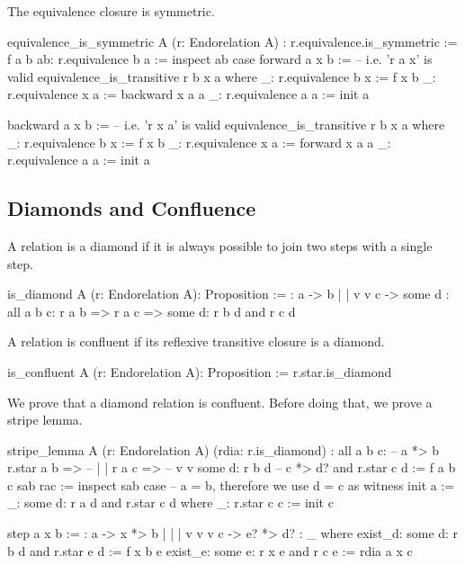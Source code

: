 The equivalence closure is symmetric.

\begin{alba}
  equivalence_is_symmetric
    A (r: Endorelation A)
    : r.equivalence.is_symmetric :=
    f a b ab: r.equivalence b a :=
      inspect ab case
        forward a x b :=   -- i.e. 'r a x' is valid
          equivalence_is_transitive r b x a where
            _: r.equivalence b x := f x b
            _: r.equivalence x a := backward x a a
            _: r.equivalence a a := init a

        backward a x b :=  -- i.e. 'r x a' is valid
          equivalence_is_transitive r b x a where
            _: r.equivalence b x := f x b
            _: r.equivalence x a := forward x a a
            _: r.equivalence a a := init a
\end{alba}






\subsection{Diamonds and Confluence}


A relation is a diamond if it is always possible to join two steps with a
single step.

\begin{alba}
  is_diamond A (r: Endorelation A): Proposition :=
      {:   a  ->  b
           |      |
           v      v
           c  -> some d :}
    all a b c:
      r a b
      => r a c
      => some d: r b d and r c d
\end{alba}


A relation is confluent if its reflexive transitive closure is a diamond.

\begin{alba}
  is_confluent A (r: Endorelation A): Proposition :=
    r.star.is_diamond
\end{alba}



We prove that a diamond relation is confluent. Before doing that, we prove a
stripe lemma.

\begin{alba}
  stripe_lemma
    A
    (r: Endorelation A)
    (rdia: r.is_diamond)
    : all a b c:                       --  a *> b
        r.star a b =>                  --  |    |
        r a c =>                       --  v    v
        some d: r b d                  --  c *> d?
                and
                r.star c d :=
     f a b c sab rac :=
       inspect sab case   -- a = b, therefore we use d = c as witness
         init a :=
           _: some d: r a d and r.star c d  where
             _: r.star c c := init c

         step a x b :=
           {:  a  -> x  *> b
               |     |     |
               v     v     v
               c  -> e? *> d? :}
           _ where
             exist_d: some d: r b d and r.star e d := f x b e
             exist_e: some e: r x e and r c e      := rdia a x c
\end{alba}

